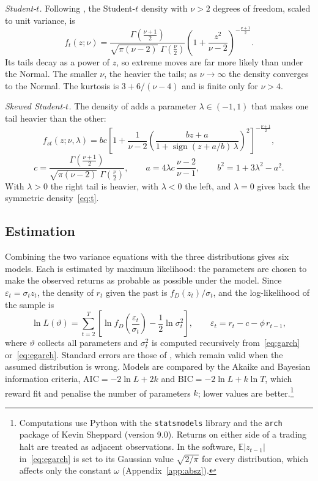 \documentclass[11pt,a4paper]{article}
\newcommand{\E}{\mathbb{E}}
\begin{document}
\emph{Student-$t$.} Following \citet{bollerslev1987}, the Student-$t$ density with $\nu>2$ degrees of freedom, scaled to unit variance, is
\begin{equation}\label{eq:t}
f_t(z;\nu)=\frac{\Gamma\!\left(\frac{\nu+1}{2}\right)}{\sqrt{\pi(\nu-2)}\;\Gamma\!\left(\frac{\nu}{2}\right)}\left(1+\frac{z^{2}}{\nu-2}\right)^{-\frac{\nu+1}{2}} .
\end{equation}
Its tails decay as a power of $z$, so extreme moves are far more likely than under the Normal. The smaller $\nu$, the heavier the tails; as $\nu\to\infty$ the density converges to the Normal. The kurtosis is $3+6/(\nu-4)$ and is finite only for $\nu>4$.

\emph{Skewed Student-$t$.} The density of \citet{hansen1994} adds a parameter $\lambda\in(-1,1)$ that makes one tail heavier than the other:
\begin{equation}\label{eq:skt}
f_{st}(z;\nu,\lambda)=
bc\left[1+\frac{1}{\nu-2}\left(\frac{bz+a}{1+\operatorname{sign}(z+a/b)\,\lambda}\right)^{2}\right]^{-\frac{\nu+1}{2}},
\end{equation}
\begin{equation*}
c=\frac{\Gamma\!\left(\frac{\nu+1}{2}\right)}{\sqrt{\pi(\nu-2)}\;\Gamma\!\left(\frac{\nu}{2}\right)},\qquad a=4\lambda c\,\frac{\nu-2}{\nu-1},\qquad b^{2}=1+3\lambda^{2}-a^{2}.
\end{equation*}
With $\lambda>0$ the right tail is heavier, with $\lambda<0$ the left, and $\lambda=0$ gives back the symmetric density~\eqref{eq:t}.

\subsection{Estimation}

Combining the two variance equations with the three distributions gives six models. Each is estimated by maximum likelihood: the parameters are chosen to make the observed returns as probable as possible under the model. Since $\varepsilon_t=\sigma_t z_t$, the density of $r_t$ given the past is $f_D(z_t)/\sigma_t$, and the log-likelihood of the sample is
\begin{equation}\label{eq:ll}
\ln L(\vartheta)=\sum_{t=2}^{T}\left[\ln f_D\!\left(\frac{\varepsilon_t}{\sigma_t}\right)-\frac{1}{2}\ln\sigma_t^{2}\right],\qquad \varepsilon_t=r_t-c-\phi\,r_{t-1},
\end{equation}
where $\vartheta$ collects all parameters and $\sigma_t^2$ is computed recursively from~\eqref{eq:garch} or~\eqref{eq:egarch}. Standard errors are those of \citet{bollerslevwooldridge1992}, which remain valid when the assumed distribution is wrong. Models are compared by the Akaike and Bayesian information criteria, $\mathrm{AIC}=-2\ln L+2k$ and $\mathrm{BIC}=-2\ln L+k\ln T$, which reward fit and penalise the number of parameters $k$; lower values are better.\footnote{Computations use Python with the \texttt{statsmodels} library and the \texttt{arch} package of Kevin Sheppard (version 9.0). Returns on either side of a trading halt are treated as adjacent observations. In the software, $\E|z_{t-1}|$ in~\eqref{eq:egarch} is set to its Gaussian value $\sqrt{2/\pi}$ for every distribution, which affects only the constant $\omega$ (Appendix~\ref{app:absz}).}
\end{document}
